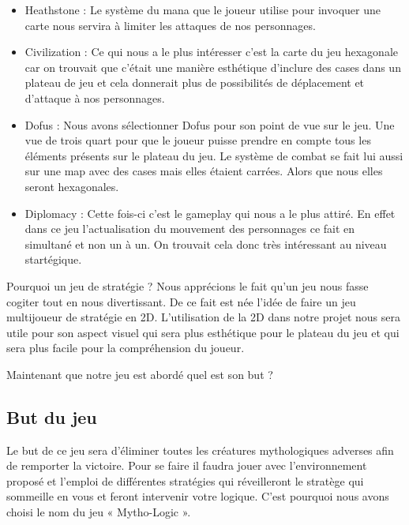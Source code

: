 \documentclass[12pt]{extarticle}
\begin{document}
\begin{itemize}[label=\textbullet]
	\item Heathstone : \newline Le système du mana que le joueur utilise pour invoquer une carte nous servira à limiter les attaques de nos personnages.
	\item Civilization : \newline Ce qui nous a le plus intéresser c’est la carte du jeu hexagonale car on trouvait que c’était une manière esthétique d’inclure des cases dans un plateau de jeu et cela donnerait plus de possibilités de déplacement et d’attaque à nos personnages.
	\item Dofus : \newline Nous avons sélectionner Dofus pour son point de vue sur le jeu. Une vue de trois quart pour que le joueur puisse prendre en compte tous les éléments présents sur le plateau du jeu. Le système de combat se fait lui aussi sur une map avec des cases mais elles étaient carrées. Alors que nous elles seront hexagonales.
	\item Diplomacy : \newline Cette fois-ci c’est le gameplay qui nous a le plus attiré. En effet dans ce jeu l’actualisation du mouvement des personnages ce fait en simultané et non un à un. On trouvait cela donc très intéressant au niveau startégique.
\end{itemize}

Pourquoi un jeu de stratégie ? Nous apprécions le fait qu’un jeu nous fasse cogiter tout en nous divertissant. De ce fait est née l’idée de faire un jeu multijoueur de stratégie en 2D. L’utilisation de la 2D dans notre projet nous sera utile pour son aspect visuel qui sera plus esthétique pour le plateau du jeu et qui sera plus facile pour la compréhension du joueur.

Maintenant que notre jeu est abordé quel est son but ? 

\subsection{But du jeu}

 Le but de ce jeu sera d’éliminer toutes les créatures mythologiques adverses afin de remporter la victoire. Pour se faire il faudra jouer avec l’environnement proposé et l’emploi de différentes stratégies qui réveilleront le stratège qui sommeille en vous et feront intervenir votre logique. C’est pourquoi nous avons choisi le nom du jeu « Mytho-Logic ».
\end{document}
